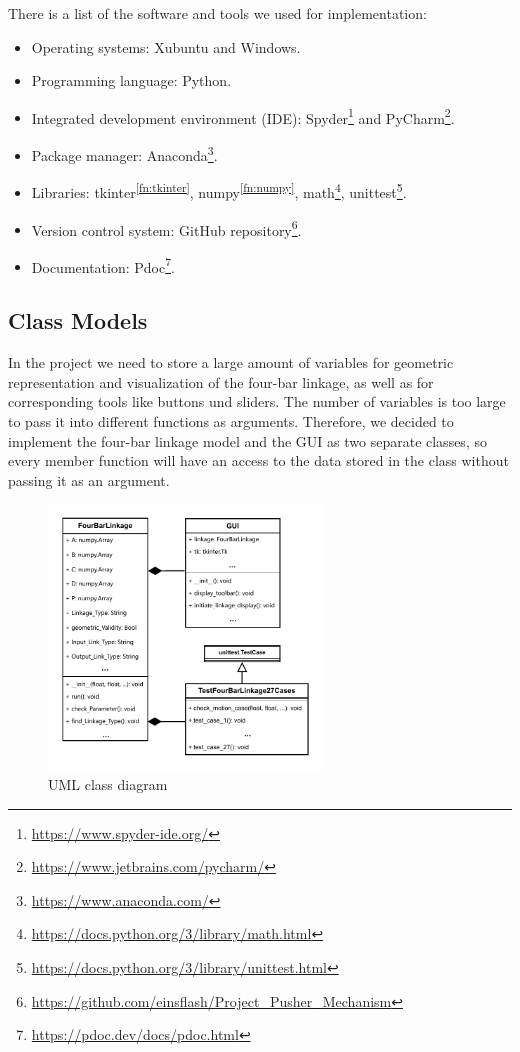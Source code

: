 \documentclass{article}
\begin{document}
There is a list of the software and tools we used for implementation:
\begin{itemize}
	\item Operating systems: Xubuntu and Windows.
	\item Programming language: Python.
	\item Integrated development environment (IDE): Spyder\footnote{\url{https://www.spyder-ide.org/}} and PyCharm\footnote{\url{https://www.jetbrains.com/pycharm/}}.
	\item Package manager: Anaconda\footnote{\url{https://www.anaconda.com/}}.
	\item Libraries: tkinter\textsuperscript{\ref{fn:tkinter}}, numpy\textsuperscript{\ref{fn:numpy}}, math\footnote{\url{https://docs.python.org/3/library/math.html}}, unittest\footnote{\url{https://docs.python.org/3/library/unittest.html}}.
	\item Version control system: GitHub repository\footnote{\url{https://github.com/einsflash/Project_Pusher_Mechanism}}.
	\item Documentation: Pdoc\footnote{\url{https://pdoc.dev/docs/pdoc.html}}.
\end{itemize}

\subsection{Class Models}

In the project we need to store a large amount of variables for geometric representation and visualization of the four-bar linkage, as well as for corresponding tools like buttons und sliders. The number of variables is too large to pass it into different functions as arguments. Therefore, we decided to implement the four-bar linkage model and the GUI as two separate classes, so every member function will have an access to the data stored in the class without passing it as an argument.

\begin{figure}[h]
	\begin{center}
		\includegraphics[width=0.65\textwidth]{./figures/class_diagram.pdf}
	\end{center}
	\caption{UML class diagram}
	\label{fig:class diagram}
\end{figure}
\end{document}

